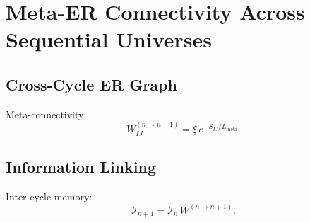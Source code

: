 \chapter{Meta-ER Connectivity Across Sequential Universes}

\section{Cross-Cycle ER Graph}
Meta-connectivity:
\[
W^{(n\rightarrow n+1)}_{IJ} = \xi\, e^{-S_{IJ}/L_{\mathrm{meta}}}.
\]

\section{Information Linking}
Inter-cycle memory:
\[
\mathcal{I}_{n+1} = \mathcal{I}_{n}\,W^{(n\rightarrow n+1)}.
\]

